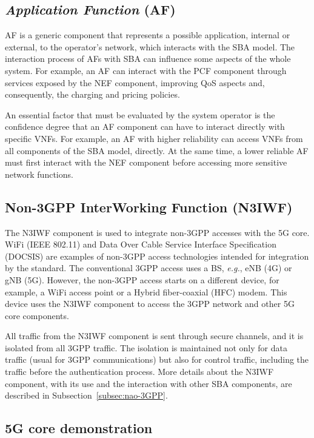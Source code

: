 \subsection*{\textit{Application Function} (AF)}

AF is a generic component that represents a possible application, internal or external, to the operator's network, which interacts with the SBA model. The interaction process of AFs with SBA can influence some aspects of the whole system. For example, an AF can interact with the PCF component through services exposed by the NEF component, improving QoS aspects and, consequently, the charging and pricing policies.

An essential factor that must be evaluated by the system operator is the confidence degree that an AF component can have to interact directly with specific VNFs. For example, an AF with higher reliability can access VNFs from all components of the SBA model, directly. At the same time, a lower reliable AF must first interact with the NEF component before accessing more sensitive network functions. 

\subsection*{Non-3GPP InterWorking Function (N3IWF)}

The N3IWF component is used to integrate non-3GPP accesses with the 5G core. WiFi (IEEE 802.11) and Data Over Cable Service Interface Specification (DOCSIS) are examples of non-3GPP access technologies intended for integration by the standard. The conventional 3GPP access uses a BS, \textit{e.g.}, eNB (4G) or gNB (5G). However, the non-3GPP access starts on a different device, for example, a WiFi access point or a Hybrid fiber-coaxial (HFC) modem. This device uses the N3IWF component to access the 3GPP network and other 5G core components.

All traffic from the N3IWF component is sent through secure channels, and it is isolated from all 3GPP traffic. The isolation is maintained not only for data traffic (usual for 3GPP communications) but also for control traffic, including the traffic before the authentication process. More details about the N3IWF component, with its use and the interaction with other SBA components, are described in Subsection~\ref{subsec:nao-3GPP}.


\subsection{5G core demonstration}\label{sec:demo_nucleo}

